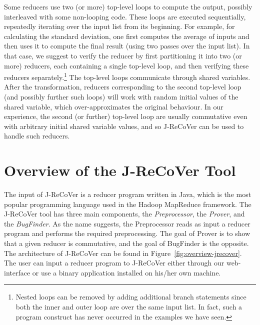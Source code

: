 \documentclass{llncs}
\begin{document}
Some reducers use two (or more) top-level loops to compute the output, possibly
interleaved with some non-looping code. These loops are executed sequentially,
repeatedly iterating over the input list from its beginning. For example, for
calculating the standard deviation, one first computes the average of inputs and
then uses it to compute the final result (using two passes over the input list).
In that case, we suggest to verify the reducer by first partitioning it into two
(or more) reducers, each containing a single top-level loop, and then verifying
these reducers separately.\footnote{Nested loops can be removed by adding
additional branch statements since both the inner and outer loop are over the
same input list. In fact, such a program construct has never occurred in the
examples we have seen.} The top-level loops communicate through shared
variables. After the transformation, reducers corresponding to the second
top-level loop (and possibly further such loops) will work with random initial
values of the shared variable, which over-approximates the original behaviour.
In our experience, the second (or further) top-level loop are usually
commutative even with arbitrary initial shared variable values, and so J-ReCoVer
can be used to handle such reducers.


\vspace*{-2mm}
\section{Overview of the J-ReCoVer Tool} \label{sec:overview}
\vspace*{-1mm}


The input of J-ReCoVer is a reducer program written in Java, which is the most
popular programming language used in the Hadoop MapReduce
framework. The J-ReCoVer tool has three main components, the
\emph{Preprocessor}, the \emph{Prover}, and the \emph{BugFinder}. As the name
suggests, the Preprocessor reads as input a reducer program and performs the
required preprocessing. The goal of Prover is to show that a given reducer is
commutative, and the goal of BugFinder is the opposite. The architecture of
J-ReCoVer can be found in Figure~\ref{fig:overview-jrecover}. The user can input
a reducer program to J-ReCoVer either through our web-interface or use a binary
application installed on his/her own machine.
\end{document}
